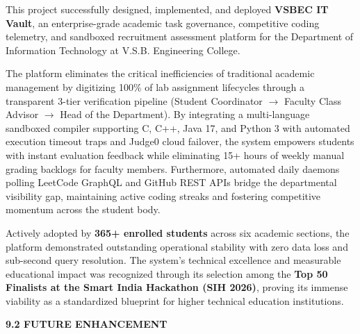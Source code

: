 {\fontsize{12pt}{17.5pt}\selectfont
This project successfully designed, implemented, and deployed \textbf{VSBEC IT Vault}, an enterprise-grade academic task governance, competitive coding telemetry, and sandboxed recruitment assessment platform for the Department of Information Technology at V.S.B. Engineering College.

The platform eliminates the critical inefficiencies of traditional academic management by digitizing 100\% of lab assignment lifecycles through a transparent 3-tier verification pipeline (Student Coordinator $\rightarrow$ Faculty Class Advisor $\rightarrow$ Head of the Department). By integrating a multi-language sandboxed compiler supporting C, C++, Java 17, and Python 3 with automated execution timeout traps and Judge0 cloud failover, the system empowers students with instant evaluation feedback while eliminating 15+ hours of weekly manual grading backlogs for faculty members. Furthermore, automated daily daemons polling LeetCode GraphQL and GitHub REST APIs bridge the departmental visibility gap, maintaining active coding streaks and fostering competitive momentum across the student body.

Actively adopted by \textbf{365+ enrolled students} across six academic sections, the platform demonstrated outstanding operational stability with zero data loss and sub-second query resolution. The system's technical excellence and measurable educational impact was recognized through its selection among the \textbf{Top 50 Finalists at the Smart India Hackathon (SIH 2026)}, proving its immense viability as a standardized blueprint for higher technical education institutions.

\vspace{0.4cm}
{\fontsize{14pt}{18pt}\selectfont\bfseries 9.2 FUTURE ENHANCEMENT\par}
\vspace{0.3cm}

}
